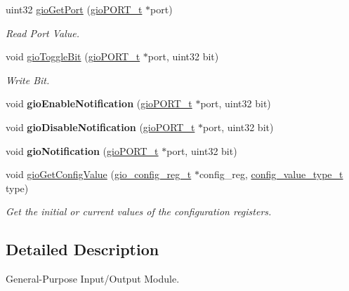 \begin{DoxyCompactItemize}
uint32 \mbox{\hyperlink{group__GIO_ga84c1081ad04ee2a9ce8f4cc3a446cfaf}{gio\+Get\+Port}} (\mbox{\hyperlink{reg__gio_8h_ad276ab0b3bc4719e20bc91adf2bfcfe7}{gio\+P\+O\+R\+T\+\_\+t}} $\ast$port)
\begin{DoxyCompactList}\small\item\em Read Port Value. \end{DoxyCompactList}\item 
void \mbox{\hyperlink{group__GIO_ga33d415247aa6af62c6ce4258da5a5f82}{gio\+Toggle\+Bit}} (\mbox{\hyperlink{reg__gio_8h_ad276ab0b3bc4719e20bc91adf2bfcfe7}{gio\+P\+O\+R\+T\+\_\+t}} $\ast$port, uint32 bit)
\begin{DoxyCompactList}\small\item\em Write Bit. \end{DoxyCompactList}\item 
\mbox{\label{group__GIO_ga917b6cc78732c67a98fc611cb1742353}} 
void {\bfseries gio\+Enable\+Notification} (\mbox{\hyperlink{reg__gio_8h_ad276ab0b3bc4719e20bc91adf2bfcfe7}{gio\+P\+O\+R\+T\+\_\+t}} $\ast$port, uint32 bit)
\item 
\mbox{\label{group__GIO_gaf8c9046075b0a6f84fc2732bf5ede5ad}} 
void {\bfseries gio\+Disable\+Notification} (\mbox{\hyperlink{reg__gio_8h_ad276ab0b3bc4719e20bc91adf2bfcfe7}{gio\+P\+O\+R\+T\+\_\+t}} $\ast$port, uint32 bit)
\item 
\mbox{\label{group__GIO_gac6e6c2a77baee906a3c25164067bd4f6}} 
void {\bfseries gio\+Notification} (\mbox{\hyperlink{reg__gio_8h_ad276ab0b3bc4719e20bc91adf2bfcfe7}{gio\+P\+O\+R\+T\+\_\+t}} $\ast$port, uint32 bit)
\item 
void \mbox{\hyperlink{group__GIO_gadf4ea1311a3d6b62f91e76ef2c6edd50}{gio\+Get\+Config\+Value}} (\mbox{\hyperlink{structgio__config__reg}{gio\+\_\+config\+\_\+reg\+\_\+t}} $\ast$config\+\_\+reg, \mbox{\hyperlink{sys__common_8h_a9daf9a5992391b058477d28d107ee5e2}{config\+\_\+value\+\_\+type\+\_\+t}} type)
\begin{DoxyCompactList}\small\item\em Get the initial or current values of the configuration registers. \end{DoxyCompactList}\end{DoxyCompactItemize}


\subsection{Detailed Description}
General-\/\+Purpose Input/\+Output Module. 

